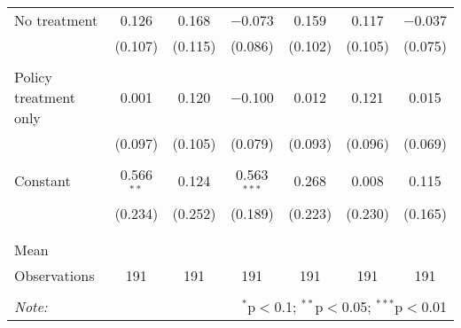 \begin{tabular}{@{\extracolsep{5pt}}lcccccc}
 No treatment & 0.126 & 0.168 & $-$0.073 & 0.159 & 0.117 & $-$0.037 \\ 
  & (0.107) & (0.115) & (0.086) & (0.102) & (0.105) & (0.075) \\ 
  & & & & & & \\ 
 Policy treatment only & 0.001 & 0.120 & $-$0.100 & 0.012 & 0.121 & 0.015 \\ 
  & (0.097) & (0.105) & (0.079) & (0.093) & (0.096) & (0.069) \\ 
  & & & & & & \\ 
 Constant & 0.566$^{**}$ & 0.124 & 0.563$^{***}$ & 0.268 & 0.008 & 0.115 \\ 
  & (0.234) & (0.252) & (0.189) & (0.223) & (0.230) & (0.165) \\ 
  & & & & & & \\ 
\hline \\[-1.8ex] 
Mean &  &  &  &  &  &  \\ 
Observations & 191 & 191 & 191 & 191 & 191 & 191 \\ 
\hline 
\hline \\[-1.8ex] 
\textit{Note:}  & \multicolumn{6}{r}{$^{*}$p$<$0.1; $^{**}$p$<$0.05; $^{***}$p$<$0.01} \\ 
\end{tabular} 
